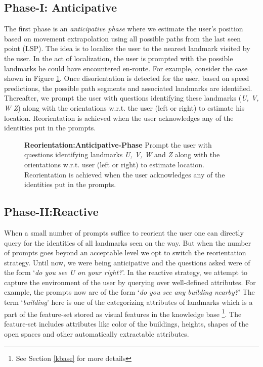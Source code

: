 \documentclass{iitkthesis}
\begin{document}
\subsection*{Phase-I: Anticipative}
The first phase is an \textit{anticipative phase} where we estimate the user's 
position based on movement extrapolation using all possible paths from 
the last seen point (LSP). The idea is to localize the user to the 
nearest landmark visited by the user. In the act of localization, the 
user is prompted with the possible landmarks he could have encountered 
en-route. For example, consider the case shown in Figure 
\ref{fig:anticipative}. Once disorientation is detected for the user, 
based on speed predictions, the possible path 
segments and associated landmarks are identified. Thereafter, we prompt 
the user with questions identifying these landmarks (\textit{U, V, W} 
\textit{Z}) along with the orientations w.r.t. the user (left or right) to 
estimate his location. Reorientation is achieved when the user 
acknowledges any of the identities put in the prompts.
\begin{figure}
\centering
{}
\caption{\textbf{Reorientation:Anticipative-Phase} Prompt the user with 
questions identifying landmarks \textit{U, V, W} and \textit{Z} along 
with the orientations w.r.t. user (left or right) to estimate location. 
Reorientation is achieved when the user acknowledges any of the 
identities put in the prompts.}
\label{fig:anticipative}
 \end{figure}
\subsection*{Phase-II:Reactive}
When a small number of prompts suffice to reorient the user one can 
directly query for the identities of all landmarks seen on the way.
But when the number of prompts goes beyond an acceptable level
we opt to switch the reorientation strategy. Until now, we were 
being anticipative and the questions asked were of the form `\textit{do 
you see U on your right?}'. In the reactive strategy, we attempt to 
capture the environment of the user by querying over well-defined 
attributes. For example, the prompts now are of the form `\textit{do 
you see any building nearby?}' The term `\textit{building}' here is one 
of the categorizing attributes of landmarks which is a part of the 
feature-set stored as visual features in the knowledge base
\footnote{See Section \ref{kbase} for more details}. The feature-set 
includes attributes like color of the buildings, heights, shapes of the 
open spaces and other automatically extractable attributes.
\end{document}
